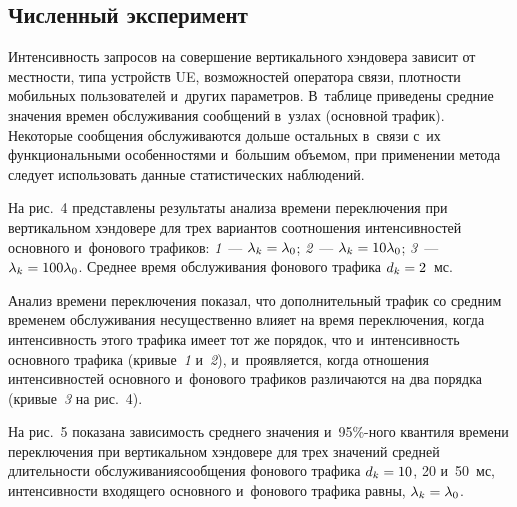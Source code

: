 \begin{multicols}{2}
\renewcommand{\figurename}{\protect\bf Рис.}
\renewcommand{\tablename}{\protect\bf Таблица}
  
  
\section{Численный эксперимент}

  Интенсивность запросов на совершение вертикального хэндовера зависит от 
местности, типа устройств UE, возможностей оператора связи, плотности 
мобильных пользователей и~других параметров. В~таблице приведены средние 
значения времен обслуживания сообщений в~узлах (основной трафик). 
Некоторые сообщения обслуживаются дольше остальных в~связи с~их 
функциональными особенностями и~б$\acute{\mbox{о}}$льшим объемом, при 
применении метода следует использовать данные статистических наблюдений. 
  

  На рис.~4 представлены результаты анализа времени переключения при 
вертикальном хэндовере для трех вариантов соотношения интенсивностей 
основного и~фонового трафиков: \textit{1}~--- $\lambda_k\hm=\lambda_0$; 
\textit{2}~--- $\lambda_k\hm=10\lambda_0$; \textit{3}~--- 
$\lambda_k\hm=100\lambda_0$. Среднее время обслуживания фонового трафика 
$d_k\hm=2$~мс.
  


  
  Анализ времени переключения показал, что дополнительный трафик со 
средним временем обслуживания несущественно влияет на время 
переключения, когда интенсивность этого трафика имеет тот же порядок, что 
и~интенсивность основного трафика (кривые~\textit{1} и~\textit{2}), 
и~проявляется, когда отношения интенсивностей основного и~фонового 
трафиков различаются на два порядка (кривые~\textit{3} на рис.~4).
  
  

На рис.~5 показана зависимость среднего значе\-ния и~95\%-ного квантиля 
времени переклю\-чения при вертикальном хэндовере для трех значений средней 
длительности обслуживания\linebreak сообщения фонового трафика $d_k\hm=10$, 20 и~50~мс, интенсивности входящего основного и~фонового трафика равны, 
$\lambda_k\hm= \lambda_0$.

\setcounter{figure}{4}

\begin{figure*} %
\vspace*{1pt}
 \begin{center}
 \mbox{%
 \epsfxsize=163.863mm 
 }
 \end{center}
\vspace*{-9pt}
\end{figure*}




\end{multicols}
